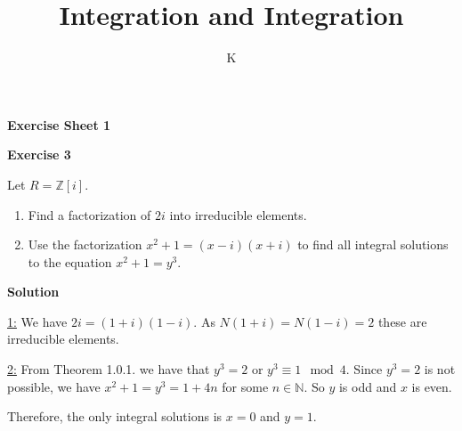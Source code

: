\documentclass[a4paper]{article}
\title{Integration and Integration}
\author{K}
\theoremstyle{definition}
\begin{document}
\begin{center}
    \noindent\textbf{Exercise Sheet 1}
\end{center}
\noindent\textbf{Exercise 3}

\noindent Let \(R = \mathbb{Z}[i]\).
\begin{enumerate}
    \item Find a factorization of \(2i\) into irreducible elements.
    \item Use the factorization \(x^2 + 1 = (x - i)(x + i)\) to find all integral solutions to the equation \(x^2 + 1 = y^3\).
\end{enumerate}

\noindent\textbf{Solution}

\noindent\underline{1:} We have \(2i = (1 + i)(1 - i)\). As \(N(1 +i) = N(1 - i) = 2\) these are irreducible elements.

\noindent\underline{2:} From Theorem 1.0.1. we have that \(y^3 = 2\) or \(y^3 \equiv 1 \mod{4}\). Since \(y^3 = 2\) is not possible, we have \(x^2 + 1 = y^3 = 1 + 4n\) for some \(n \in \mathbb{N}\). So \(y\) is odd and \(x\) is even.

Therefore, the only integral solutions is \(x = 0\) and \(y = 1\).
\end{document}
